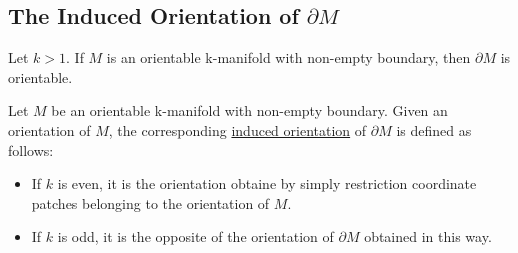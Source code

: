 \subsection{The Induced Orientation of $\partial M$}

\begin{theorem}
    Let $k>1$. If $M$ is an orientable k-manifold with non-empty boundary, then $\partial M$ is orientable.
\end{theorem}

\begin{definition}
    Let $M$ be an orientable k-manifold with non-empty boundary. Given an orientation of $M$, the corresponding \underline{induced orientation} of $\partial M$ is defined as follows: 
    \begin{itemize}
        \item If $k$ is even, it is the orientation obtaine by simply restriction coordinate patches belonging to the orientation of $M$.
        \item If $k$ is odd, it is the opposite of the orientation of $\partial M$ obtained in this way.
    \end{itemize}
\end{definition}

